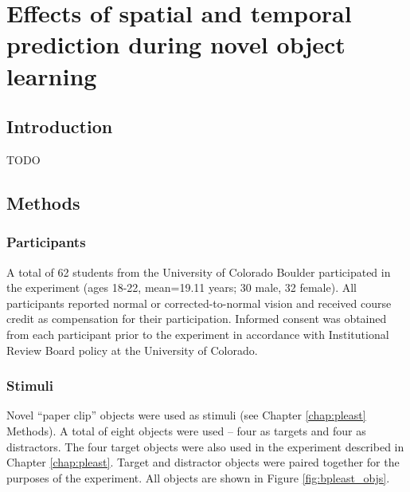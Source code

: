 \documentclass[dwyatte_dissertation.tex]{subfiles}
\begin{document}
\chapter{Effects of spatial and temporal prediction during novel object learning}
\label{chap:bpleast}

\section{Introduction}
TODO

\section{Methods}

\subsection{Participants}
A total of 62 students from the University of Colorado Boulder participated in the experiment (ages 18-22, mean=19.11 years; 30 male, 32 female). All participants reported normal or corrected-to-normal vision and received course credit as	compensation for their participation. Informed consent was obtained from each participant prior to the experiment in accordance with Institutional Review Board policy at the University of Colorado.

\subsection{Stimuli}
Novel ``paper clip'' objects were used as stimuli (see Chapter \ref{chap:pleast} Methods). A total of eight objects were used -- four as targets and four as distractors. The four target objects were also used in the experiment described in Chapter \ref{chap:pleast}. Target and distractor objects were paired together for the purposes of the experiment. All objects are shown in Figure \ref{fig:bpleast_objs}.
\end{document}
